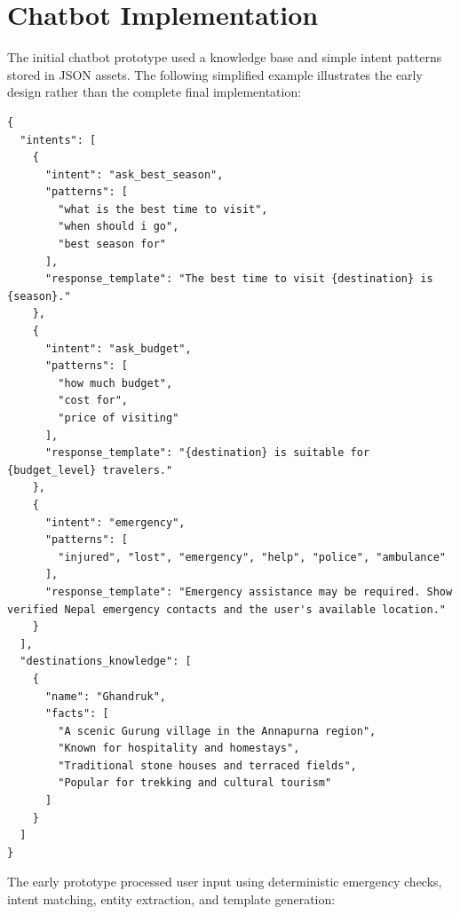 \documentclass[12pt,a4paper,oneside]{report}
\begin{document}
\section{Chatbot Implementation}
\label{sec:chatbot_impl}

The initial chatbot prototype used a knowledge base and simple intent patterns stored in JSON assets. The following simplified example illustrates the early design rather than the complete final implementation:

\begin{lstlisting}
{
  "intents": [
    {
      "intent": "ask_best_season",
      "patterns": [
        "what is the best time to visit",
        "when should i go",
        "best season for"
      ],
      "response_template": "The best time to visit {destination} is {season}."
    },
    {
      "intent": "ask_budget",
      "patterns": [
        "how much budget",
        "cost for",
        "price of visiting"
      ],
      "response_template": "{destination} is suitable for {budget_level} travelers."
    },
    {
      "intent": "emergency",
      "patterns": [
        "injured", "lost", "emergency", "help", "police", "ambulance"
      ],
      "response_template": "Emergency assistance may be required. Show verified Nepal emergency contacts and the user's available location."
    }
  ],
  "destinations_knowledge": [
    {
      "name": "Ghandruk",
      "facts": [
        "A scenic Gurung village in the Annapurna region",
        "Known for hospitality and homestays",
        "Traditional stone houses and terraced fields",
        "Popular for trekking and cultural tourism"
      ]
    }
  ]
}
\end{lstlisting}

The early prototype processed user input using deterministic emergency checks, intent matching, entity extraction, and template generation:
\end{document}
